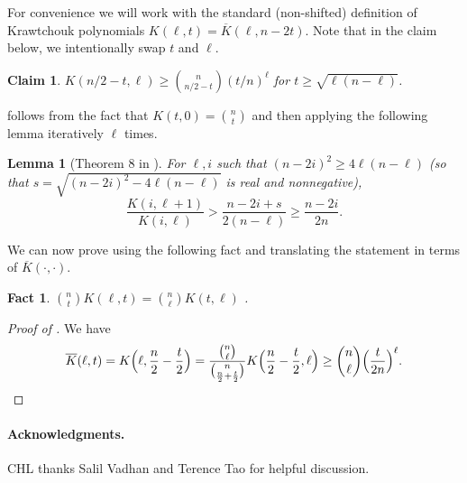 \documentclass[10pt,a4paper]{article}
\newtheorem{lemma}[theorem]{Lemma}
\newtheorem{claim}[theorem]{Claim}
\newtheorem{fact}[theorem]{Fact}
\theoremstyle{definition}
\newcommand{\ol}[1]{\overline{#1}}
\def\sK{\ol{K}}
\begin{document}
For convenience we will work with the standard (non-shifted) definition of Krawtchouk polynomials $K(\ell,t) = \sK(\ell,n-2t)$.
Note that in the claim below, we intentionally swap $t$ and $\ell$.
\begin{claim} \label{claim:K-lb}
  $K(n/2-t,\ell) \ge \binom{n}{n/2-t} (t/n)^\ell$ for $t \ge \sqrt{\ell(n-\ell)}$.
\end{claim}

 follows from the fact that $K(t,0) = \binom{n}{t}$ and then applying the following lemma iteratively $\ell$ times.

\begin{lemma}[Theorem 8 in \cite{Kra01}]
  For $\ell,i$ such that $(n-2i)^2 \ge 4\ell(n-\ell)$ (so that $s = \sqrt{(n-2i)^2 - 4\ell(n-\ell)}$ is real and nonnegative),
  \[
    \frac{K(i,\ell+1)}{K(i,\ell)} > \frac{n-2i+s}{2(n-\ell)} \ge \frac{n-2i}{2n} .
  \]
\end{lemma}

We can now prove  using the following fact and translating the statement in terms of $\sK(\cdot,\cdot)$.
\begin{fact}
  $\binom{n}{t} K(\ell,t) = \binom{n}{\ell} K(t,\ell)$ .
\end{fact}

\begin{proof}[Proof of ]
  We have
  \[
    \sK(\ell,t)
    = K\Bigl(\ell,\frac{n}{2}-\frac{t}{2}\Bigr)
    = \frac{\binom{n}{\ell}}{\binom{n}{\frac{n}{2}+\frac{t}{2}}} K\Bigl(\frac{n}{2}-\frac{t}{2},\ell\Bigr)
    \ge \binom{n}{\ell} \Bigl(\frac{t}{2n}\Bigr)^\ell . \qedhere
  \]
\end{proof}



\paragraph{Acknowledgments.} CHL thanks Salil Vadhan and Terence Tao for helpful discussion.
\end{document}
